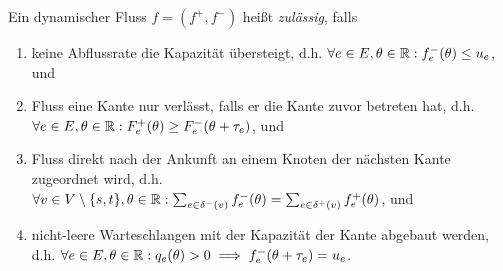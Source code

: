 \begin{definition}
	Ein dynamischer Fluss $f=(f^+, f^-)$ heißt \emph{zulässig}, falls
	\begin{enumerate}[label=(F\arabic*)]
		\item\label{def-feasible-flow-capacity} keine Abflussrate die Kapazität übersteigt, d.h. $\forall e\in E, \theta\in\mathbb{R}: f_e^-(\theta)\leq u_e$, und
		\item\label{def-feasible-flow-no-negative-flow} Fluss eine Kante nur verlässt, falls er die Kante zuvor betreten hat, d.h. $\forall e\in E, \theta\in\mathbb{R}: F_e^+(\theta) \geq F_e^-(\theta + \tau_e)$, und
		\item\label{def-feasible-flow-no-flow-at-node} Fluss direkt nach der Ankunft an einem Knoten der nächsten Kante zugeordnet wird, d.h. $\forall v\in V\setminus \{ s, t \}, \theta\in\mathbb{R}: \sum_{e\in\delta^-(v)}f^-_e(\theta) = \sum_{e\in\delta^+(v)} f_e^+(\theta)$, und
		\item\label{def-feasible-flow-queue-with-capacity} nicht-leere Warteschlangen mit der Kapazität der Kante abgebaut werden, d.h. $\forall e\in E, \theta\in\mathbb{R}: q_e(\theta) > 0 \implies f_e^-(\theta + \tau_e) = u_e$.
	\end{enumerate}
\end{definition}




